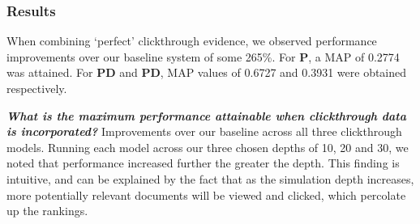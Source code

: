 \subsubsection{Results}
When combining `perfect' clickthrough evidence, we observed performance improvements over our baseline system of some 265\%. For \textbf{P}, a MAP of 0.2774 was attained. For \textbf{PD} and \textbf{PD}, MAP values of 0.6727 and 0.3931 were obtained respectively.



\textbf{\emph{What is the maximum performance attainable when clickthrough data is incorporated?}}
Improvements over our baseline across all three clickthrough models. Running each model across our three chosen depths of 10, 20 and 30, we noted that performance increased further the greater the depth. This finding is intuitive, and can be explained by the fact that as the simulation depth increases, more potentially relevant documents will be viewed and clicked, which percolate up the rankings.

